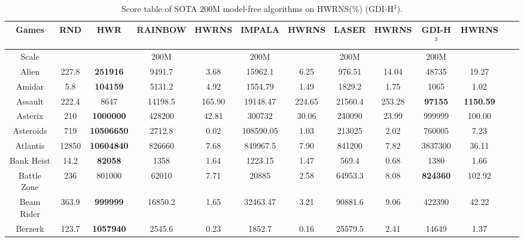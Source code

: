 \documentclass[nohyperref]{article}
\theoremstyle{plain}
\begin{document}
\begin{table}[!hb]
\footnotesize
\begin{center}
\caption{Score table of SOTA 200M model-free algorithms on HWRNS(\%)  (GDI-H$^3$). }
\setlength{\tabcolsep}{1.0pt}
\begin{tabular}{|c| c| c| c c| c c| c c| c c| c c|}
\hline
Games               & RND       & HWR       & RAINBOW  & HWRNS & IMPALA  & HWRNS & LASER  & HWRNS  & GDI-H$^3$ & HWRNS \\
\hline
Scale               &           &           & 200M     &           &  200M   &            & 200M    &                      &    200M   &\\
\hline
 Alien              & 227.8     & \textbf{251916}    & 9491.7   &3.68    & 15962.1    & 6.25       & 976.51  & 14.04      &48735             &19.27   \\
 Amidar             & 5.8       & \textbf{104159}    & 5131.2   &4.92    & 1554.79    & 1.49       & 1829.2  & 1.75        &1065              &1.02          \\
 Assault            & 222.4     & 8647             & 14198.5  &165.90  & 19148.47   & 224.65     & 21560.4 & 253.28      &\textbf{97155}             &\textbf{1150.59} \\
 Asterix            & 210       & \textbf{1000000}   & 428200   &42.81   & 300732     & 30.06      & 240090  & 23.99     &999999            &100.00 \\
 Asteroids          & 719       & \textbf{10506650}  & 2712.8   &0.02    & 108590.05  & 1.03       & 213025  & 2.02        &760005            &7.23\\
 Atlantis           & 12850     & \textbf{10604840}  & 826660   &7.68    & 849967.5   & 7.90       & 841200  & 7.82      &3837300           &36.11\\
 Bank Heist         & 14.2      & \textbf{82058}     & 1358     &1.64    & 1223.15    & 1.47       & 569.4   & 0.68       &1380              &1.66  \\
 Battle Zone        & 236       & 801000    & 62010    &7.71    & 20885      & 2.58       & 64953.3 & 8.08       &\textbf{824360}            &102.92 \\
 Beam Rider         & 363.9     & \textbf{999999}    & 16850.2  &1.65    & 32463.47   & 3.21       & 90881.6 & 9.06        &422390            &42.22   \\
 Berzerk            & 123.7     & \textbf{1057940}   & 2545.6   &0.23    & 1852.7     & 0.16       & 25579.5 & 2.41        &14649             &1.37          \\

\end{tabular}
\end{center}
\end{table}
\end{document}
